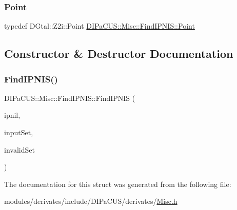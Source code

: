 \subsubsection{\texorpdfstring{Point}{Point}}
{\footnotesize\ttfamily typedef D\+Gtal\+::\+Z2i\+::\+Point \hyperlink{structDIPaCUS_1_1Misc_1_1FindIPNIS_af4506f1e1704bc3ee542ee3000694ee1}{D\+I\+Pa\+C\+U\+S\+::\+Misc\+::\+Find\+I\+P\+N\+I\+S\+::\+Point}}



\subsection{Constructor \& Destructor Documentation}
\mbox{\label{structDIPaCUS_1_1Misc_1_1FindIPNIS_a2a14b039bc1efdc8adfa4285d8b65972}} 
\subsubsection{\texorpdfstring{Find\+I\+P\+N\+I\+S()}{FindIPNIS()}}
{\footnotesize\ttfamily D\+I\+Pa\+C\+U\+S\+::\+Misc\+::\+Find\+I\+P\+N\+I\+S\+::\+Find\+I\+P\+N\+IS (\begin{DoxyParamCaption}\item[{\hyperlink{structDIPaCUS_1_1Misc_1_1FindIPNIS_af4506f1e1704bc3ee542ee3000694ee1}{Point} \&}]{ipnil,  }\item[{const \hyperlink{structDIPaCUS_1_1Misc_1_1FindIPNIS_aa92a8a962ef5fb194297977646f84dc4}{Digital\+Set} \&}]{input\+Set,  }\item[{const \hyperlink{structDIPaCUS_1_1Misc_1_1FindIPNIS_aa92a8a962ef5fb194297977646f84dc4}{Digital\+Set} \&}]{invalid\+Set }\end{DoxyParamCaption})}



The documentation for this struct was generated from the following file\+:\begin{DoxyCompactItemize}
\item 
modules/derivates/include/\+D\+I\+Pa\+C\+U\+S/derivates/\hyperlink{Misc_8h}{Misc.\+h}\end{DoxyCompactItemize}
